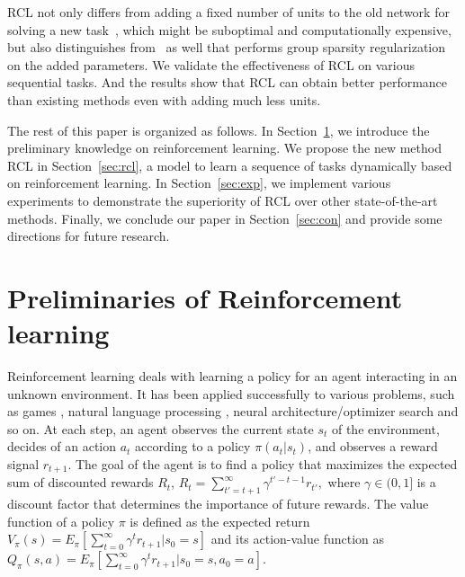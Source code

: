 \documentclass{article}
\begin{document}
RCL not only differs from adding a fixed number of units to the old network for solving a new task~\cite{rusu1}, which might be suboptimal and computationally expensive, but also distinguishes from~\cite{yoon1} as well that performs group sparsity regularization on the added  parameters.  We validate the effectiveness of RCL on various sequential tasks. And the results show that RCL can obtain better performance than existing methods even with adding much less units.


The rest of this paper is organized as follows. In Section~\ref{sec:pre}, we introduce the preliminary knowledge on reinforcement learning. We propose the new method RCL in Section~\ref{sec:rcl}, a model to learn a sequence of tasks dynamically based on reinforcement learning. In Section~\ref{sec:exp}, we implement various experiments to demonstrate the superiority of  RCL over other state-of-the-art methods. Finally, we conclude our paper in Section~\ref{sec:con} and provide some directions for future research.


\section{Preliminaries of Reinforcement learning}
\label{sec:pre}
Reinforcement learning \cite{sutton1} deals with learning a policy for an
agent interacting in an unknown environment. It has been applied successfully to various problems, such as games \cite{minh1,silver1}, natural language processing \cite{yu1}, neural architecture/optimizer search \cite{zoph1,bello1} and so on. At each step,
an agent observes the current state $s_t$ of the environment,
decides of an action $a_t$ according to a policy $\pi(a_t | s_t)$, and observes
a reward signal $r_{t+1}$. The goal of the agent is to find a policy
that maximizes the expected sum of discounted rewards $R_t$,
$R_t = \sum_{t'=t+1}^\infty \gamma^{t'-t-1 }r_{t'},$
where $\gamma \in (0,1]$ is a discount factor that determines the importance of
future rewards.
 The value function of a policy $\pi$ is defined as the expected return $V_{\pi}(s) = E_\pi[\sum_{t=0}^\infty\gamma^{t}r_{t+1}|s_0 = s]$ and its action-value function as $Q_{\pi}(s,a) = E_\pi[\sum_{t=0}^\infty\gamma^{t}r_{t+1}|s_0 = s, a_0 =a]$.
\end{document}
